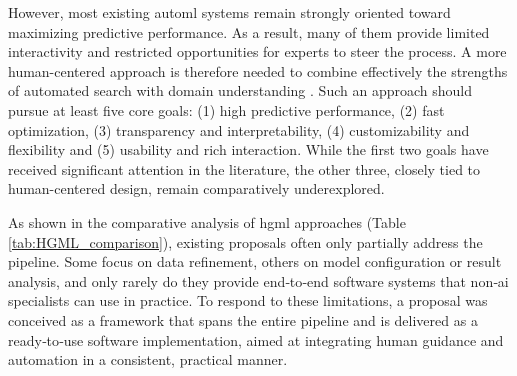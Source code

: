 \documentclass[twoside,final]{Contexto}
\begin{document}
However, most existing \gls{automl} systems remain strongly oriented toward maximizing predictive performance. As a result, many of them provide limited interactivity and restricted opportunities for experts to steer the process. A more human-centered approach is therefore needed to combine effectively the strengths of automated search with domain understanding \cite{lindauer2024position}. Such an approach should pursue at least five core goals: (1) high predictive performance, (2) fast optimization, (3) transparency and interpretability, (4) customizability and flexibility and (5) usability and rich interaction. While the first two goals have received significant attention in the literature, the other three, closely tied to human-centered design, remain comparatively underexplored.

As shown in the comparative analysis of \gls{hgml} approaches (Table \ref{tab:HGML_comparison}), existing proposals often only partially address the pipeline. Some focus on data refinement, others on model configuration or result analysis, and only rarely do they provide end‑to‑end software systems that non‑\gls{ai} specialists can use in practice. To respond to these limitations, a proposal was conceived as a framework that spans the entire pipeline and is delivered as a ready‑to‑use software implementation, aimed at integrating human guidance and automation in a consistent, practical manner.
\end{document}
